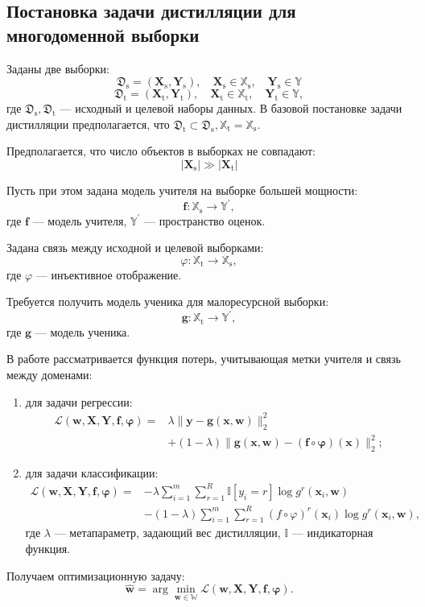 \subsection{Постановка задачи дистилляции для многодоменной выборки}

Заданы две выборки:
$$\mathfrak{D}_{\text{s}}=(\mathbf{X}_{\text{s}},\mathbf{Y}_{\text{s}}),
\quad \mathbf{X}_{\text{s}} \in \mathbb{X}_{\text{s}},
\quad \mathbf{Y}_{\text{s}} \in \mathbb{Y}$$
$$\mathfrak{D}_{\text{t}}=(\mathbf{X}_{\text{t}},\mathbf{Y}_{\text{t}}), \quad \mathbf{X}_{\text{t}} \in \mathbb{X}_{\text{t}},
\quad \mathbf{Y}_{\text{t}} \in \mathbb{Y},$$
где $\mathfrak{D}_{\text{s}}, \mathfrak{D}_{\text{t}}$ --- исходный и целевой наборы данных. В базовой постановке задачи дистилляции предполагается, что 
$\mathfrak{D}_{\text{t}} \subset \mathfrak{D}_{\text{s}},
\mathbb{X}_{\text{t}}=\mathbb{X}_{\text{s}}$.

Предполагается, что число объектов в выборках не совпадают:
$$|\mathbf{X}_{\text{s}}| \gg |\mathbf{X}_{\text{t}}|$$

Пусть при этом задана модель учителя на выборке большей мощности:
$$\mathbf{f}: \mathbb{X}_{\text{s}} \rightarrow \mathbb{Y}^{\prime},$$
где $\mathbf{f}$ --- модель учителя, $\mathbb{Y}^{\prime}$ --- пространство оценок.

Задана связь между исходной и целевой выборками:
$$\varphi: \mathbb{X}_{\text{t}} \rightarrow \mathbb{X}_{\text{s}},$$
где $\varphi$ ---  инъективное отображение.

Требуется получить модель ученика для малоресурсной выборки:
$$\mathbf{g}: \mathbb{X}_{\text{t}} \rightarrow \mathbb{Y}^{\prime},$$
где $\mathbf{g}$ --- модель ученика.

В работе рассматривается функция потерь, учитывающая метки учителя и связь между доменами:
\begin{enumerate}
    \item для задачи регрессии:
    \[
    \begin{aligned}
    \mathcal{L}(\mathbf{w,X,Y,f,\varphi})=&\lambda\|\mathbf{y}-\mathbf{g}(\mathbf{x},\mathbf{w})\|_{2}^{2}\\
    &+(1-\lambda)\|\mathbf{g}(\mathbf{x},\mathbf{w})-(\mathbf{f}\circ \mathbf{\varphi})(\mathbf{x})\|_{2}^{2};
    \end{aligned}
    \]
    \item для задачи классификации:
    \[
    \begin{aligned}
    \mathcal{L}(\mathbf{w,X,Y,f,\varphi})=&-\lambda\sum\limits_{i=1}^{m}\sum\limits_{r=1}^{R}\mathbb{I}[y_{i}=r]\log{g^{r}(\mathbf{x}_{i},\mathbf{w})}\\
    &-(1-\lambda)\sum\limits_{i=1}^{m}\sum\limits_{r=1}^{R}(f\circ \varphi)^{r}(\mathbf{x}_{i})\log{g^{r}(\mathbf{x}_{i},\mathbf{w})},
    \end{aligned}
    \]
    где $\lambda$ --- метапараметр, задающий вес дистилляции, $\mathbb{I}$ --- индикаторная функция.
\end{enumerate}

Получаем оптимизационную задачу:
$$\hat{\mathbf{w}} = \arg\min_{\mathbf{w} \in \mathbb{W}} \mathcal{L}(\mathbf{w,X,Y,f,\varphi}).$$
